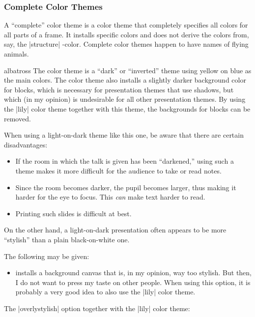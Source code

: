 \subsubsection{Complete Color Themes}

A ``complete'' color theme is a color theme that completely specifies
all colors for all parts of a frame. It installs specific colors and
does not derive the colors from, say, the |structure| \beamer-color.
Complete color themes happen to have names of flying animals.

\begin{colorthemeexample}{albatross}
  The color theme is a ``dark'' or ``inverted'' theme using yellow on
  blue as the main colors. The color theme also installs a slightly
  darker background color for blocks, which is necessary for
  presentation themes that use shadows, but which (in my opinion) is
  undesirable for all other presentation themes. By using the |lily|
  color theme together with this theme, the backgrounds for blocks can
  be removed.

  When using a light-on-dark theme like this one, be aware that there
  are certain disadvantages:
  \begin{itemize}
  \item
    If the room in which the talk is given has been ``darkened,''
    using such a theme makes it more difficult for the audience to
    take or read notes.
  \item
    Since the room becomes darker, the pupil becomes larger, thus
    making it harder for the eye to focus. This \emph{can} make text
    harder to  read.
  \item
    Printing such slides is difficult at best.
  \end{itemize}

  On the other hand, a light-on-dark presentation often appears to be
  more ``stylish''  than a plain black-on-white one.

  The following  may be given:
  \begin{itemize}
  \item {} installs a background canvas that
    is, in my opinion, way too stylish. But then, I do not want
    to press my taste on other people. When using this option, it is
    probably a very good idea to also use the |lily| color theme.
  \end{itemize}

  \example The |overlystylish| option together with the |lily| color theme:
\end{colorthemeexample}



